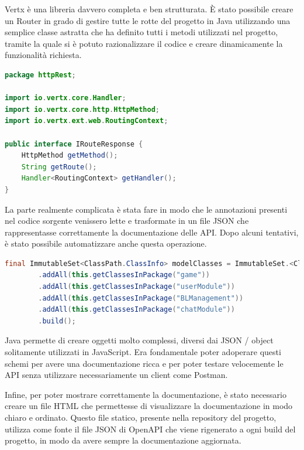 \vspace{1cm}

Vertx è una libreria davvero completa e ben strutturata. È stato possibile creare un Router in grado di gestire tutte le rotte del progetto in Java utilizzando una semplice classe astratta che ha definito tutti i metodi utilizzati nel progetto, tramite la quale si è potuto razionalizzare il codice e creare dinamicamente la funzionalità richiesta.

\begin{lstlisting}[language=Java, caption={Semplice interfaccia per le rotte HTTP}, label=list:java_swagger_interface]
package httpRest;

import io.vertx.core.Handler;
import io.vertx.core.http.HttpMethod;
import io.vertx.ext.web.RoutingContext;

public interface IRouteResponse {
    HttpMethod getMethod();
    String getRoute();
    Handler<RoutingContext> getHandler();
}
\end{lstlisting}

La parte realmente complicata è stata fare in modo che le annotazioni presenti nel codice sorgente venissero lette e trasformate in un file JSON che rappresentasse correttamente la documentazione delle API. 
Dopo alcuni tentativi, è stato possibile automatizzare anche questa operazione.

\begin{lstlisting}[language=Java, caption={Aggiunta dei moduli delle classi contenenti rotte HTTP}, label=list:java_swagger_modules]
final ImmutableSet<ClassPath.ClassInfo> modelClasses = ImmutableSet.<ClassPath.ClassInfo>builder()
        .addAll(this.getClassesInPackage("game"))
        .addAll(this.getClassesInPackage("userModule"))
        .addAll(this.getClassesInPackage("BLManagement"))
        .addAll(this.getClassesInPackage("chatModule"))
        .build();
\end{lstlisting}

\vspace{1cm}

Java permette di creare oggetti molto complessi, diversi dai JSON / object solitamente utilizzati in JavaScript. Era fondamentale poter adoperare questi schemi per avere una documentazione ricca e per poter testare velocemente le API senza utilizzare necessariamente un client come Postman. 

Infine, per poter mostrare correttamente la documentazione, è stato necessario creare un file HTML che permettesse di visualizzare la documentazione in modo chiaro e ordinato. Questo file statico, presente nella repository del progetto, utilizza come fonte il file JSON di OpenAPI che viene rigenerato a ogni build del progetto, in modo da avere sempre la documentazione aggiornata.

